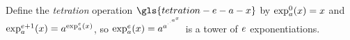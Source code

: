 
Define the \emph{tetration} operation $\gls{tetration-e-a-x}$ by
$\exp_{a}^{0}(x) = x$ and $\exp_{a}^{e+1}(x) = a^{\exp_{a}^{e}(x)}$,
so $\exp_{a}^{e}(x) = a^{a^{\cdot^{\cdot^{{a^x}}}}}$ is a tower of
$e$ exponentiations.